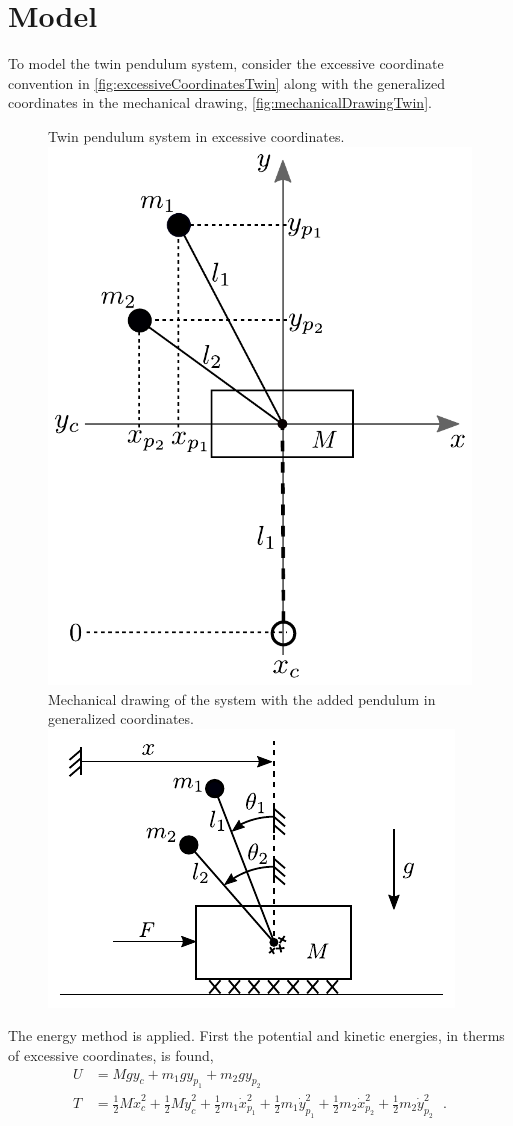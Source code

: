 \section{Model}
To model the twin pendulum system, consider the excessive coordinate convention in \autoref{fig:excessiveCoordinatesTwin} along with the generalized coordinates in the mechanical drawing, \autoref{fig:mechanicalDrawingTwin}.
\begin{figure}[H]
  \captionbox
  {
    Twin pendulum system in excessive coordinates.
    \label{fig:excessiveCoordinatesTwin}
  }
  {
    \hspace{-1cm}
    \includegraphics[width=.35\textwidth]{figures/excessiveCoordinatesTwin}
  }
  \hspace{40pt}
  \captionbox
  {
    Mechanical drawing of the system with the added pendulum in generalized coordinates.
    \label{fig:mechanicalDrawingTwin}
  }
  {
    \hspace{-1cm}
    \includegraphics[width=.43\textwidth]{figures/mechanicalDrawingTwin}\vspace{1.2cm}
  }  
\end{figure}
%
The energy method is applied. First the potential and kinetic energies, in therms of excessive coordinates, is found,
\begin{align}
  U &= M g y_c + m_1 g y_{p_1} + m_2 g y_{p_2}  \label{eq:potentialEnergyTwin}  \\
  T &= \tfrac{1}{2} M \dot{x}_c^2 + \tfrac{1}{2} M \dot{y}_c^2 + \tfrac{1}{2} m_1 \dot{x}_{p_1}^2  + \tfrac{1}{2} m_1 \dot{y}_{p_1}^2 + \tfrac{1}{2} m_2 \dot{x}_{p_2}^2 + \tfrac{1}{2} m_2 \dot{y}_{p_2}^2 \label{eq:kineticEnergyTwin} \ \ \ .
\end{align}
